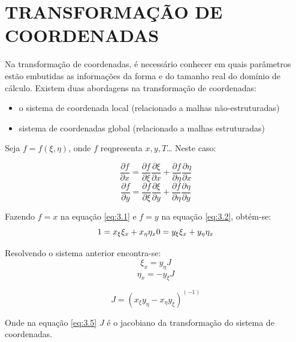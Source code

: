 \chapter[TRANSFORMAÇÃO DE COORDENADAS]{TRANSFORMAÇÃO DE COORDENADAS}

Na transformação de coordenadas, é necessário conhecer em quais parâmetros estão embutidas as informações da forma e do tamanho real do domínio de cálculo. Existem duas abordagens na transformação de coordenadas:
\begin{itemize}
    \item o sistema de coordenada local (relacionado a malhas não-estruturadas)
    \item sistema de coordenadas global (relacionado a malhas estruturadas)
\end{itemize}

Seja $f=f(\xi, \eta)$, onde $f$ reqpresenta $x,y,T$\dots
Neste caso:

\begin{equation}
    \frac{\partial f}{\partial x} = \frac{\partial f}{\partial \xi}\frac{\partial \xi}{\partial x}+\frac{\partial f}{\partial \eta}\frac{\partial \eta}{\partial x}
    \label{eq:3.1}
\end{equation}
\begin{equation}
    \frac{\partial f}{\partial y} = \frac{\partial f}{\partial \xi}\frac{\partial \xi}{\partial y}+\frac{\partial f}{\partial \eta}\frac{\partial \eta}{\partial y}
    \label{eq:3.2}
\end{equation}

Fazendo $f=x$ na equação \ref{eq:3.1} e $f=y$ na equação \ref{eq:3.2}, obtém-se:
\begin{equation*}
    1 = x_\xi \xi_x + x_\eta \eta_x\\
    0 = y_\xi \xi_x + y_\eta \eta_x
\end{equation*}

Resolvendo o sistema anterior encontra-se:
\begin{equation}
    \label{eq:3.3}
    \xi_x = y_\eta J
\end{equation}
\begin{equation}
    \label{eq:3.4}
    \eta_x = -y_\xi J
\end{equation}

\begin{equation}
    J = (x_\xi y_\eta - x_\eta y_\xi)^(-1)
    \label{eq:3.5}
\end{equation}

Onde na equação \ref{eq:3.5} $J$  é o jacobiano da transformação do sistema de coordenadas.

